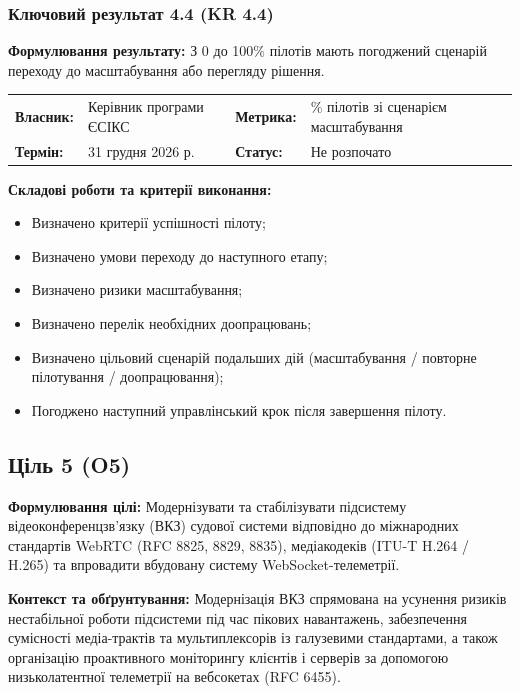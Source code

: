 \documentclass{article}
\begin{document}
\subsubsection{Ключовий результат 4.4 (KR 4.4)}

\textbf{Формулювання результату:} З 0 до 100\% пілотів мають погоджений сценарій переходу до масштабування або перегляду рішення.

\noindent\begin{tabular}{@{}p{2.2cm}p{4.5cm}p{2.2cm}p{4.5cm}@{}}
\toprule
\textbf{Власник:} & Керівник програми ЄСІКС & \textbf{Метрика:} & \% пілотів зі сценарієм масштабування \\
\textbf{Термін:} & 31 грудня 2026 р. & \textbf{Статус:} & Не розпочато \\
\bottomrule
\end{tabular}

\vspace{10pt}
\textbf{Складові роботи та критерії виконання:}
\begin{itemize}
    \item Визначено критерії успішності пілоту;
    \item Визначено умови переходу до наступного етапу;
    \item Визначено ризики масштабування;
    \item Визначено перелік необхідних доопрацювань;
    \item Визначено цільовий сценарій подальших дій (масштабування / повторне пілотування / доопрацювання);
    \item Погоджено наступний управлінський крок після завершення пілоту.
\end{itemize}

\newpage

\subsection{Ціль 5 (O5)}

\textbf{Формулювання цілі:} Модернізувати та стабілізувати підсистему відеоконференцзв’язку (ВКЗ) судової системи відповідно до міжнародних стандартів WebRTC (RFC 8825, 8829, 8835), медіакодеків (ITU-T H.264 / H.265) та впровадити вбудовану систему WebSocket-телеметрії.

\textbf{Контекст та обґрунтування:}
Модернізація ВКЗ спрямована на усунення ризиків нестабільної роботи підсистеми під час пікових навантажень, забезпечення сумісності медіа-трактів та мультиплексорів із галузевими стандартами, а також організацію проактивного моніторингу клієнтів і серверів за допомогою низьколатентної телеметрії на вебсокетах (RFC 6455).
\end{document}
